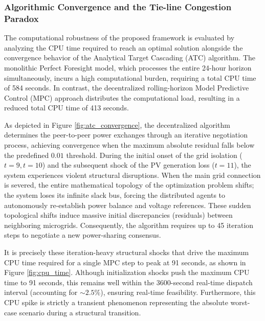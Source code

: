 \subsubsection{Algorithmic Convergence and the Tie-line Congestion Paradox}

The computational robustness of the proposed framework is evaluated by analyzing the CPU time required to reach an optimal solution alongside the convergence behavior of the Analytical Target Cascading (ATC) algorithm. The monolithic Perfect Foresight model, which processes the entire 24-hour horizon simultaneously, incurs a high computational burden, requiring a total CPU time of 584 seconds. In contrast, the decentralized rolling-horizon Model Predictive Control (MPC) approach distributes the computational load, resulting in a reduced total CPU time of 413 seconds. 

As depicted in Figure \ref{fig:atc_convergence}, the decentralized algorithm determines the peer-to-peer power exchanges through an iterative negotiation process, achieving convergence when the maximum absolute residual falls below the predefined $0.01$ threshold. During the initial onset of the grid isolation ($t=9, t=10$) and the subsequent shock of the PV generation loss ($t=11$), the system experiences violent structural disruptions. When the main grid connection is severed, the entire mathematical topology of the optimization problem shifts; the system loses its infinite slack bus, forcing the distributed agents to autonomously re-establish power balance and voltage references. These sudden topological shifts induce massive initial discrepancies (residuals) between neighboring microgrids. Consequently, the algorithm requires up to 45 iteration steps to negotiate a new power-sharing consensus. 

It is precisely these iteration-heavy structural shocks that drive the maximum CPU time required for a single MPC step to peak at 91 seconds, as shown in Figure \ref{fig:cpu_time}. Although initialization shocks push the maximum CPU time to 91 seconds, this remains well within the 3600-second real-time dispatch interval (accounting for $\sim 2.5\%$), ensuring real-time feasibility. Furthermore, this CPU spike is strictly a transient phenomenon representing the absolute worst-case scenario during a structural transition. 

